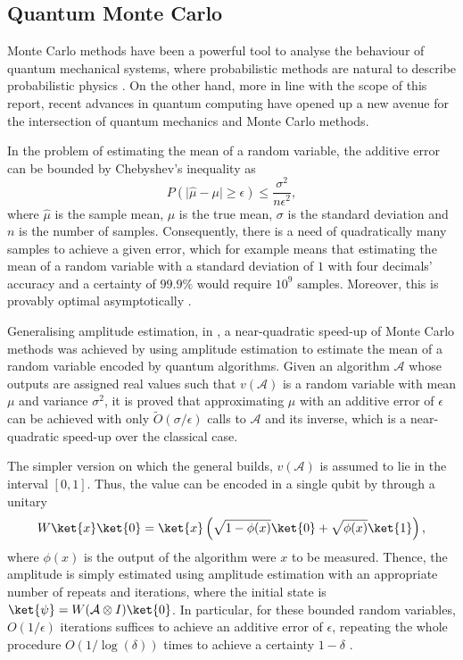 \subsection{Quantum Monte Carlo}
\label{sec:qmc}
Monte Carlo methods have been a powerful tool to analyse the behaviour of quantum mechanical systems, where probabilistic methods are natural to describe probabilistic physics \cite{ceperley1986, austin2012,gubernatis2016}.
On the other hand, more in line with the scope of this report, recent advances in quantum computing have opened up a new avenue for the intersection of quantum mechanics and Monte Carlo methods.

In the problem of estimating the mean of a random variable, the additive error can be bounded by Chebyshev's inequality as
\begin{equation}
    P(\lvert \hat\mu - \mu \rvert \geq \epsilon) \leq \frac{\sigma^2}{n \epsilon^2},
\end{equation}
where $\hat\mu$ is the sample mean, $\mu$ is the true mean, $\sigma$ is the standard deviation and $n$ is the number of samples.
Consequently, there is a need of quadratically many samples to achieve a given error, which for example means that estimating the mean of a random variable with a standard deviation of $1$ with four decimals' accuracy and a certainty of $99.9\%$ would require $10^9$ samples.
Moreover, this is provably optimal asymptotically \cite{dagum2000}.

Generalising amplitude estimation, in \cite{montanaro2015}, a near-quadratic speed-up of Monte Carlo methods was achieved by using amplitude estimation to estimate the mean of a random variable encoded by quantum algorithms.
Given an algorithm $\mathcal{A}$ whose outputs are assigned real values such that $v(\mathcal{A})$ is a random variable with mean $\mu$ and variance $\sigma^2$, it is proved that approximating $\mu$ with an additive error of $\epsilon$ can be achieved with only $\tilde{O}(\sigma/\epsilon)$ calls to $\mathcal{A}$ and its inverse, which is a near-quadratic speed-up over the classical case\footnotemark{}.


The simpler version on which the general builds, $v(\mathcal{A})$ is assumed to lie in the interval $[0,1]$.
Thus, the value can be encoded in a single qubit by through a unitary
\begin{equation}
    W\ket{x}\ket{0} = \ket{x}\left(\sqrt{1 - \phi(x)}\ket{0} + \sqrt{\phi(x)}\ket{1}\right),
\end{equation}
where $\phi(x)$ is the output of the algorithm were $x$ to be measured.
Thence, the amplitude is simply estimated using amplitude estimation with an appropriate number of repeats and iterations, where the initial state is $\ket{\psi} = W(\mathcal{A} \otimes I)\ket{0}$.
In particular, for these bounded random variables, $O(1/\epsilon)$ iterations suffices to achieve an additive error of $\epsilon$, repeating the whole procedure $O(1/\log(\delta))$ times to achieve a certainty $1-\delta$ \cite{montanaro2015}.